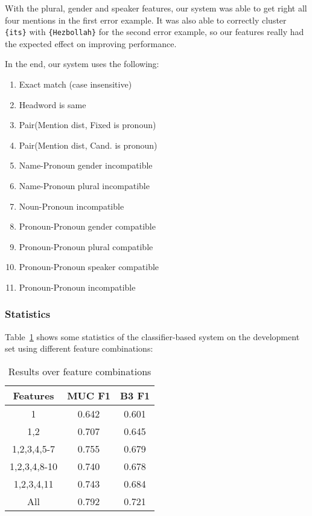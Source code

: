 \documentclass[12pt, twocolumn]{article}
\begin{document}
With the plural, gender and speaker features, our system was able to get right all four mentions in the first error example.
It was also able to correctly cluster \texttt{\{its\}} with \texttt{\{Hezbollah\}} for the second error example, so our features really had the expected effect on improving performance.

In the end, our system uses the following:
\begin{enumerate}[(1)]
\item Exact match (case insensitive)
\item Headword is same
\item Pair(Mention dist, Fixed is pronoun) 
\item Pair(Mention dist, Cand. is pronoun) 
\item Name-Pronoun gender incompatible
\item Name-Pronoun plural incompatible
\item Noun-Pronoun incompatible
\item Pronoun-Pronoun gender compatible
\item Pronoun-Pronoun plural compatible
\item Pronoun-Pronoun speaker compatible
\item Pronoun-Pronoun incompatible
\end{enumerate}
\subsubsection{Statistics}
Table~\ref{tab:features} shows some statistics of the classifier-based system on the development set using different feature combinations:
\begin{table}[H]
\begin{center}
\begin{tabular}{|c|c|c|}
\hline
Features & MUC F1 & B3 F1\\\hline
1 & 0.642 & 0.601 \\\hline
1,2 & 0.707 & 0.645 \\\hline
1,2,3,4,5-7 & 0.755 & 0.679\\\hline
1,2,3,4,8-10 & 0.740 & 0.678\\\hline
1,2,3,4,11 & 0.743 & 0.684 \\\hline
All & 0.792 & 0.721 \\\hline
\end{tabular}
\end{center}
\caption{Results over feature combinations}
\label{tab:features}
\end{table}
\end{document}
